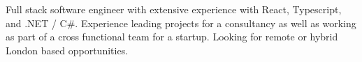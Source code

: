 

\begin{cvparagraph}

Full stack software engineer with extensive experience with React, Typescript, and .NET / C\#.  
Experience leading projects for a consultancy as well as working as part of a cross functional team for a startup.
Looking for remote or hybrid London based opportunities.
\end{cvparagraph}
